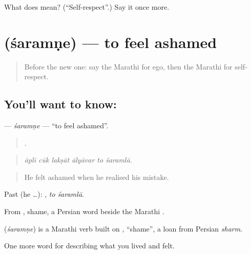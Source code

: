 \begin{tcolorbox}[breakable,colback=teal!4,colframe=teal!35!black,title={Before you move on}]
What does  mean? (\textquotedblleft{}Self-respect\textquotedblright{}.) Say it once more.
\end{tcolorbox}
\section[\texorpdfstring{\mr{शरमणे} (śaramṇe)}{शरमणे (śaramṇe)}]{ (śaramṇe) — to feel ashamed}

\label{lesson:MR-C463-saramne}



\begin{quote}
Before the new one: say the Marathi for ego, then the Marathi for self-respect.
\end{quote}

\subsection*{You'll want to know: }
\textbf{} — \emph{śaramṇe} — \textquotedblleft{}to feel ashamed\textquotedblright{}.

\begin{quote}
     .
\end{quote}

\begin{quote}
\emph{āplī cūk lakṣāt ālyāvar to śaramlā.}
\end{quote}

\begin{quote}
He felt ashamed when he realised his mistake.
\end{quote}

Past (he …):  , \emph{to śaramlā}.

From , shame, a Persian word beside the Marathi .

\begin{cousinweb}
\textbf{} (\emph{śaramṇe}) is a Marathi verb built on , \textquotedblleft{}shame\textquotedblright{}, a loan from Persian \emph{sharm}.
\end{cousinweb}

\begin{grammarlens}[title={What you've built}]
One more word for describing what you lived and felt.
\end{grammarlens}

